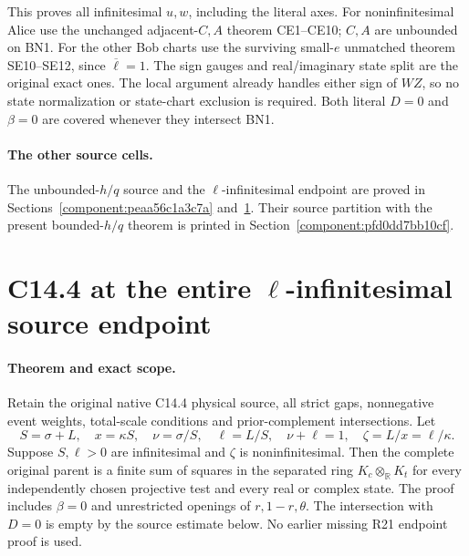 This proves all infinitesimal $u,w$, including the literal axes.
For noninfinitesimal Alice use the unchanged adjacent-$C,A$ theorem
CE1--CE10; $C,A$ are unbounded on BN1. For the other Bob charts use
the surviving small-$e$ unmatched theorem SE10--SE12, since
$\overline\ell=1$. The sign gauges and real/imaginary state split
are the original exact ones. The local argument already handles
either sign of $WZ$, so no state normalization or state-chart
exclusion is required. Both literal $D=0$ and $\beta=0$ are covered
whenever they intersect BN1.

\paragraph{The other source cells.}
The unbounded-$h/q$ source and the $\ell$-infinitesimal endpoint are proved in Sections~\ref{component:peaa56c1a3c7a} and~\ref{component:pb96c9bfcc12d}. Their source partition with the present bounded-$h/q$ theorem is printed in Section~\ref{component:pfd0dd7bb10cf}.


\section{\texorpdfstring{C14.4 at the entire $\ell$-infinitesimal source endpoint}{C14.4 at the entire ell-infinitesimal source endpoint}}
\label{component:pb96c9bfcc12d}

\label{pb96c9bfcc12d:sec:c144-ell-endpoint-rederived}

\paragraph{Theorem and exact scope.}
Retain the original native C14.4 physical source, all strict gaps,
nonnegative event weights, total-scale conditions and prior-complement
intersections.  Let
\[
 S=\sigma+L,\quad x=\kappa S,\quad
 \nu=\sigma/S,\quad\ell=L/S,\quad\nu+\ell=1,
 \quad\zeta=L/x=\ell/\kappa.
\]
Suppose $S,\ell>0$ are infinitesimal and $\zeta$ is
noninfinitesimal.  Then the complete original parent is a finite
sum of squares in the separated ring
$K_c\otimes_{\mathbb R}K_t$ for every independently chosen
projective test and every real or complex state.  The proof includes
$\beta=0$ and unrestricted openings of $r,1-r,\theta$.
The intersection with $D=0$ is empty by the source estimate below.
No earlier missing R21 endpoint proof is used.


